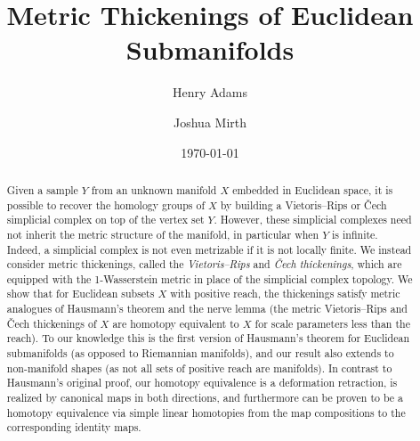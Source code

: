 \documentclass{amsart}
\theoremstyle{plain}
\theoremstyle{definition}
\theoremstyle{myremark}
\begin{document}
\title{Metric Thickenings of Euclidean Submanifolds}
\author{Henry Adams}
\address{Department of Mathematics, Colorado State University, Fort Collins, CO 80523, United States}
\author{Joshua Mirth}
\address{Department of Mathematics, Colorado State University, Fort Collins, CO 80523, United States}
\date{\today}

\begin{abstract}
Given a sample $Y$ from an unknown manifold $X$ embedded in Euclidean space, it is possible to recover the homology groups of $X$ by building a Vietoris--Rips or \v{C}ech simplicial complex on top of the vertex set $Y$.
However, these simplicial complexes need not inherit the metric structure of the manifold, in particular when $Y$ is infinite. Indeed, a simplicial complex is not even metrizable if it is not locally finite.
We instead consider metric thickenings, called the \emph{Vietoris--Rips} and \emph{\v{C}ech thickenings}, which are equipped with the 1-Wasserstein metric in place of the simplicial complex topology.
We show that for Euclidean subsets $X$ with positive reach, the thickenings satisfy metric analogues of Hausmann's theorem and the nerve lemma (the metric Vietoris--Rips and \v{C}ech thickenings of $X$ are homotopy equivalent to $X$ for scale parameters less than the reach).
To our knowledge this is the first version of Hausmann's theorem for Euclidean submanifolds (as opposed to Riemannian manifolds), and our result also extends to non-manifold shapes (as not all sets of positive reach are manifolds).
In contrast to Hausmann's original proof, our homotopy equivalence is a deformation retraction, is realized by canonical maps in both directions, and furthermore can be proven to be a homotopy equivalence via simple linear homotopies from the map compositions to the corresponding identity maps.

\end{abstract}
\maketitle
\end{document}

